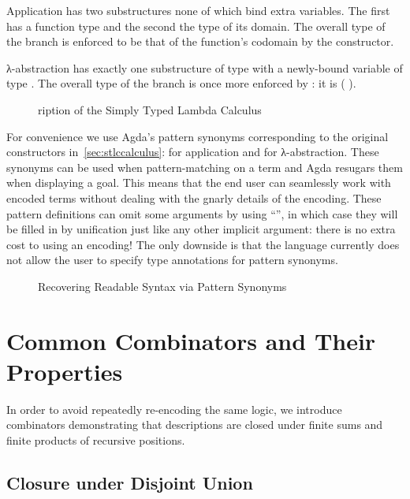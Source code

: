 Application has two substructures none of which bind extra variables. The first
has a function type and the second the type of its domain. The overall type of
the branch is enforced to be that of the function's codomain by the 
constructor.

λ-abstraction has exactly one substructure of type  with a newly-bound
variable of type . The overall type of the branch is once more enforced
by : it is (  ).

\begin{figure}[h]
\caption{ription of the Simply Typed Lambda Calculus\label{fig:descstlc}}
\end{figure}

For convenience we use Agda's pattern synonyms corresponding to the
original constructors in~\cref{sec:stlccalculus}:
 for application and  for λ-abstraction. These
synonyms can be used when pattern-matching on a term and Agda resugars
them when displaying a goal. This means that the end user can
seamlessly work with encoded terms without dealing with the gnarly
details of the encoding.  These pattern definitions can omit some
arguments by using ``\AS{\_}'', in which case they will be filled in
by unification just like any other implicit argument: there is no
extra cost to using an encoding!  The only downside is that the
language currently does not allow the user to specify type annotations
for pattern synonyms.

\begin{figure}[h]
\caption{Recovering Readable Syntax via Pattern Synonyms}
\end{figure}

\section{Common Combinators and Their Properties}\label{desccomb}

In order to avoid repeatedly re-encoding the same logic, we introduce
combinators demonstrating that descriptions are closed under finite
sums and finite products of recursive positions.

\subsection{Closure under Disjoint Union}

